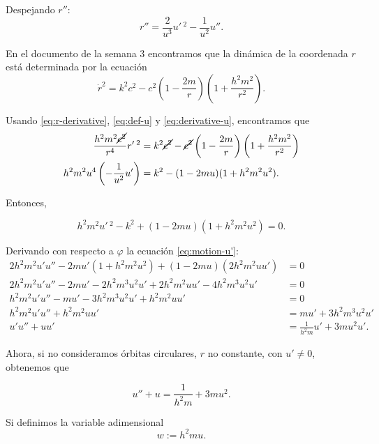 \documentclass[letterpaper,11pt]{article}
\begin{document}
Despejando $r''$:
\begin{equation} \label{eq:2nd-derivative-u}
r'' = \frac{2}{u^3} u'\,^2 - \frac{1}{u^2} u''.
\end{equation}

En el documento de la semana 3 encontramos que la dinámica de la coordenada $r$ está determinada por la ecuación
\begin{equation}
\dot{r}^2 = k^2c^2 - c^2 \left(1 - \frac{2m}{r}\right)\left(1 + \frac{h^2m^2}{r^2}\right).
\end{equation}

Usando \eqref{eq:r-derivative}, \eqref{eq:def-u} y \eqref{eq:derivative-u}, encontramos que 
\begin{align}
\frac{h^2m^2\cancel{c^2}}{r^4} r'\,^2 &= k^2\cancel{c^2} - \cancel{c^2} \left(1 - \frac{2m}{r} \right)\left(1 + \frac{h^2m^2}{r^2}\right) \\
h^2m^2u^4 \left(-\frac{1}{u^2} u' \right) &= k^2 - (1-2mu)(1+h^2m^2u^2). 
\end{align} 

Entonces,
\begin{shaded}
\begin{equation} \label{eq:motion-u'}
h^2m^2u'\,^2 - k^2 + (1-2mu)(1+h^2m^2u^2) = 0.
\end{equation}
\end{shaded}

Derivando con respecto a $\varphi$ la ecuación \eqref{eq:motion-u'}:
\begin{align}
2h^2m^2u' u'' - 2mu' (1+h^2m^2u^2) + (1-2mu)(2h^2m^2uu') &= 0 \\
2h^2m^2u' u'' - 2mu' - 2h^2m^3u^2u' + 2h^2m^2uu' - 4h^2m^3u^2u' &= 0 \\
h^2m^2 u' u'' - m u' - 3h^2m^3 u^2 u' + h^2m^2 u u' &= 0 \\
h^2m^2 u' u'' + h^2m^2 u u' &=  m u' + 3h^2m^3 u^2 u' \\
 u' u'' +  u u' &=  \frac{1}{h^2 m} u' + 3m u^2 u'.
\end{align}

Ahora, si no consideramos órbitas circulares, $r$ no constante, con $u' \neq 0$, obtenemos que
\begin{shaded}
\begin{equation} \label{eq:motion-u''}
u'' + u = \frac{1}{h^2m} + 3mu^2.
\end{equation}
\end{shaded}

Si definimos la variable adimensional
\begin{equation}
w := h^2m u.
\end{equation}
\end{document}
